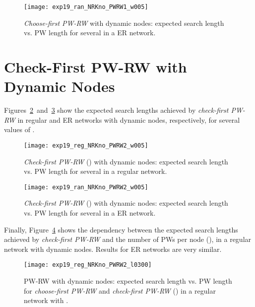 \documentclass[]{elsarticle}
\begin{document}
\begin{figure}[h]
 \centering
 \texttt{[image: exp19\_ran\_NRKno\_PWRW1\_w005]}
 \caption{\emph{Choose-first PW-RW} with dynamic nodes: expected search length  vs. PW length  for several  in a ER network.}
 \label{fig:random_pw1_dynnodes}
\end{figure}

\section{Check-First PW-RW with Dynamic Nodes}

Figures~\ref{fig:regular_pw2_dynnodes}~and~\ref{fig:random_pw2_dynnodes} show the expected search lengths achieved by \emph{check-first PW-RW} in regular and ER networks with dynamic nodes, respectively, for several values of .


\begin{figure}[h]
 \centering
 \texttt{[image: exp19\_reg\_NRKno\_PWRW2\_w005]}
 \caption{\emph{Check-first PW-RW} () with dynamic nodes: expected search length  vs. PW length  for several  in a regular network.}
 \label{fig:regular_pw2_dynnodes}
\end{figure}

\begin{figure}[h]
 \centering
 \texttt{[image: exp19\_ran\_NRKno\_PWRW2\_w005]}
 \caption{\emph{Check-first PW-RW} () with dynamic nodes: expected search length  vs. PW length  for several  in a ER network.}
 \label{fig:random_pw2_dynnodes}
\end{figure}

Finally, Figure~\ref{fig:regular_pw1_pw2_dynnodes} shows the dependency between the expected search lengths achieved by \emph{check-first PW-RW} and the number of PWs per node (), in a regular network with dynamic nodes. Results for ER networks are very similar.


\begin{figure}[h]
 \centering
 \texttt{[image: exp19\_reg\_NRKno\_PWRW2\_l0300]}
 \caption{PW-RW with dynamic nodes: expected search length  vs. PW length  for \emph{choose-first PW-RW} and \emph{check-first PW-RW} () in a regular network with .}
 \label{fig:regular_pw1_pw2_dynnodes}
\end{figure}
\end{document}
